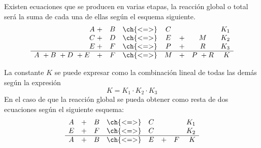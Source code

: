     \setcounter{ejemplo}{0}
    Existen ecuaciones que se producen en varias etapas, la reacción global o total será la suma de cada una de ellas según el esquema siguiente.
    \begin{equation*}
        \begin{array}{cccccccr}
            A\hspace*{-3cm}  & + & B & \ch{<=>} & C &   &        & K_1 \\
            C\hspace*{-3cm}  & + & D & \ch{<=>} & E & + & M      & K_2 \\
            E\hspace*{-3cm}  & + & F & \ch{<=>} & P & + & R      & K_3 \\
            \hline
            A\ + B\ + D\ + E & + & F & \ch{<=>} & M & + & P\ + R & K   \\
        \end{array}
    \end{equation*}

    La constante \(K\) se puede expresar como la combinación lineal de todas las demás según la expresión
    \begin{equation*}
        K = K_1\cdot K_2\cdot K_3
    \end{equation*}
    En el caso de que la reacción global se pueda obtener como resta de dos ecuaciones según el siguiente esquema:
    \begin{equation*}
        \begin{array}{cccccccr}
            A & + & B & \ch{<=>} & C &   &   & K_1 \\
            E & + & F & \ch{<=>} & C &   &   & K_2 \\
            \hline
            A & + & B & \ch{<=>} & E & + & F & K
        \end{array}
    \end{equation*}

